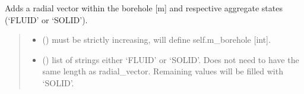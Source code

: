 \documentclass[letterpaper,10pt,english]{sphinxmanual}
\begin{document}
\begin{fulllineitems}
\begin{fulllineitems}
\label{\detokenize{tscw_module:tscw_module.tscw_DataClassesInput.GacaFieldData.add_boreholeVector}}
\pysigstartsignatures
{}
\pysigstopsignatures
\sphinxAtStartPar
Adds a radial vector within the borehole {[}m{]} and respective aggregate states (‘FLUID’ or ‘SOLID’).
\begin{quote}\begin{description}
\begin{itemize}
\item {} 
\sphinxAtStartPar
{} (\sphinxstyleliteralemphasis{\sphinxupquote{ {[}}}\sphinxstyleliteralemphasis{\sphinxupquote{{]}}}) \textendash{} must be strictly increasing, will define self.m\_borehole {[}int{]}.

\item {} 
\sphinxAtStartPar
{} () \textendash{} list of strings either ‘FLUID’ or ‘SOLID’.
Does not need to have the same length as radial\_vector.
Remaining values will be filled with ‘SOLID’.

\end{itemize}

\end{description}\end{quote}

\end{fulllineitems}



\end{fulllineitems}
\end{document}

